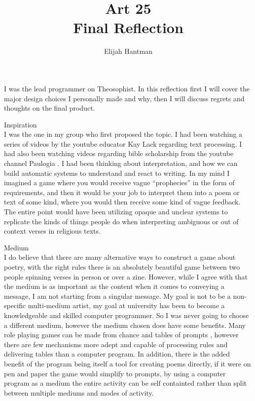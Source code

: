 \documentclass[12pt]{report}
\title{\Huge{Art 25}\\Final Reflection}
\author{\huge{Elijah Hantman}}
\date{}
\begin{document}
\maketitle
\newpage


\begin{description}
    I was the lead programmer on Theosophist. In this reflection first I will cover the
    major design choices I personally made and why, then I will discuss regrets and thoughts on the final product.

\item {\large Inspiration}\\

    I was the one in my group who first proposed the topic. I had been watching a series of videos by the youtube 
    educator Kay Lack \parencite{lack} regarding text processing. I had also been watching videos regarding bible 
    scholarship from the youtube channel Paulogia \parencite{paul}. I had been thinking about interpretation, and 
    how we can build automatic systems to understand and react to writing. In my mind I imagined a game where you 
    would receive vague “prophecies” in the form of requirements, and then it would be your job to interpret them into 
    a poem or text of some kind, where you would then receive some kind of vague feedback. The entire point would have been 
    utilizing opaque and unclear systems to replicate the kinds of things people do when interpreting ambiguous or out of 
    context verses in religious texts.

\item {\large Medium}\\

    I do believe that there are many alternative ways to construct a game about poetry, with the right rules there is an
    absolutely beautiful game between two people spinning verses in person or over a zine. However, while I agree 
    with \cite{medium} that the medium is as important as the content when it comes to conveying a message, 
    I am not starting from a singular message. My goal is not to be a non-specific multi-medium artist, my goal at 
    university has been to become a knowledgeable and skilled  computer programmer. So I was never going to choose a 
    different medium, however the medium chosen does have some benefits. Many role playing games can be made from 
    chance and tables of prompts \parencite{rolerules}, however there are few mechanisms more adept and capable of 
    processing rules and delivering tables than a computer program. In addition, there is the added benefit of the 
    program being itself a tool for creating poems directly, if it were on pen and paper the game would simplify to 
    prompts, by using a computer program as a medium the entire activity can be self containted rather than split
    between multiple mediums and modes of activity.


\end{description}
\end{document}
